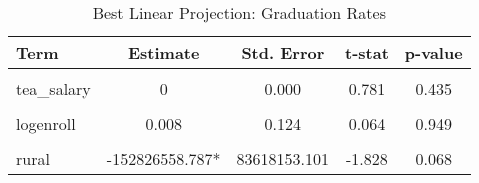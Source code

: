 \begin{table}[!h]
\centering
\caption{\label{tab:blp_afgr}Best Linear Projection: Graduation Rates}
\centering
\begin{tabular}[t]{lcccc}
\toprule
Term & Estimate & Std. Error & t-stat & p-value\\
\midrule
\cellcolor{gray!10}{(Intercept)} & \cellcolor{gray!10}{0.162***} & \cellcolor{gray!10}{0.052} & \cellcolor{gray!10}{3.097} & \cellcolor{gray!10}{0.002}\\
tea\_salary & 0 & 0.000 & 0.781 & 0.435\\
\cellcolor{gray!10}{p\_rev} & \cellcolor{gray!10}{0} & \cellcolor{gray!10}{0.000} & \cellcolor{gray!10}{-0.682} & \cellcolor{gray!10}{0.495}\\
logenroll & 0.008 & 0.124 & 0.064 & 0.949\\
\cellcolor{gray!10}{perhsp} & \cellcolor{gray!10}{-1.412} & \cellcolor{gray!10}{1.694} & \cellcolor{gray!10}{-0.834} & \cellcolor{gray!10}{0.404}\\
rural & -152826558.787* & 83618153.101 & -1.828 & 0.068\\
\bottomrule
\end{tabular}
\end{table}

